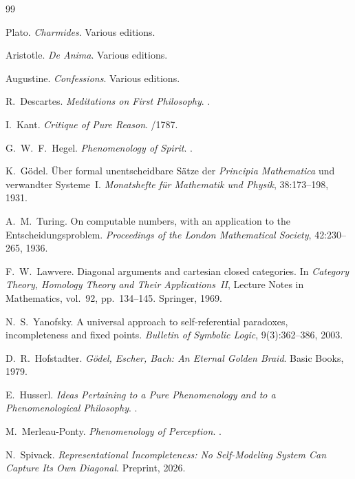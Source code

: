 \documentclass[11pt]{article}
\theoremstyle{plain}
\theoremstyle{definition}
\theoremstyle{remark}
\begin{document}
\begin{thebibliography}{99}

Plato.
\newblock \emph{Charmides}.
\newblock Various editions.

Aristotle.
\newblock \emph{De Anima}.
\newblock Various editions.

Augustine.
\newblock \emph{Confessions}.
\newblock Various editions.

R.~Descartes.
\newblock \emph{Meditations on First Philosophy}.
.

I.~Kant.
\newblock \emph{Critique of Pure Reason}.
/1787.

G.~W.~F.~Hegel.
\newblock \emph{Phenomenology of Spirit}.
.

K.~G\"odel.
\newblock \"Uber formal unentscheidbare S\"atze der \emph{Principia Mathematica}
  und verwandter Systeme~I.
\newblock \emph{Monatshefte f\"ur Mathematik und Physik}, 38:173--198, 1931.

A.~M.~Turing.
\newblock On computable numbers, with an application to the Entscheidungsproblem.
\newblock \emph{Proceedings of the London Mathematical Society}, 42:230--265, 1936.

F.~W.~Lawvere.
\newblock Diagonal arguments and cartesian closed categories.
\newblock In \emph{Category Theory, Homology Theory and Their Applications~II},
  Lecture Notes in Mathematics, vol.~92, pp.~134--145. Springer, 1969.

N.~S.~Yanofsky.
\newblock A universal approach to self-referential paradoxes, incompleteness and fixed points.
\newblock \emph{Bulletin of Symbolic Logic}, 9(3):362--386, 2003.

D.~R.~Hofstadter.
\newblock \emph{G\"odel, Escher, Bach: An Eternal Golden Braid}.
\newblock Basic Books, 1979.

E.~Husserl.
\newblock \emph{Ideas Pertaining to a Pure Phenomenology and to a Phenomenological Philosophy}.
.

M.~Merleau-Ponty.
\newblock \emph{Phenomenology of Perception}.
.

N.~Spivack.
\newblock \emph{Representational Incompleteness: No Self-Modeling System Can Capture Its Own Diagonal}.
\newblock Preprint, 2026.


\end{thebibliography}
\end{document}
